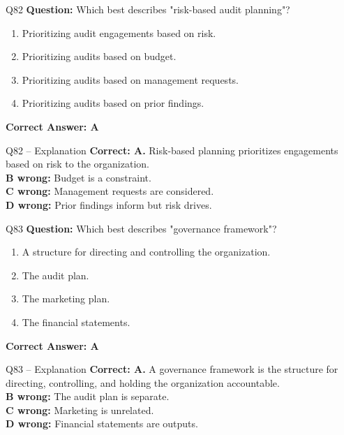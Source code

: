 \documentclass[aspectratio=169,10pt]{beamer}
\begin{document}
	\begin{frame}[t]{Q82}
		\small
		\textbf{Question:} Which best describes "risk-based audit planning"?
		\begin{enumerate}[label=\Alph*.,itemsep=1pt,topsep=2pt]
			\item Prioritizing audit engagements based on risk.
			\item Prioritizing audits based on budget.
			\item Prioritizing audits based on management requests.
			\item Prioritizing audits based on prior findings.
		\end{enumerate}
		\vspace{4pt}
		\textbf{Correct Answer: A}
	\end{frame}
	
	\begin{frame}[t]{Q82 -- Explanation}
		\small
		\textbf{Correct: A.} Risk-based planning prioritizes engagements based on risk to the organization. \\[4pt]
		\textbf{B wrong:} Budget is a constraint. \\[2pt]
		\textbf{C wrong:} Management requests are considered. \\[2pt]
		\textbf{D wrong:} Prior findings inform but risk drives.
	\end{frame}
	
	\begin{frame}[t]{Q83}
		\small
		\textbf{Question:} Which best describes "governance framework"?
		\begin{enumerate}[label=\Alph*.,itemsep=1pt,topsep=2pt]
			\item A structure for directing and controlling the organization.
			\item The audit plan.
			\item The marketing plan.
			\item The financial statements.
		\end{enumerate}
		\vspace{4pt}
		\textbf{Correct Answer: A}
	\end{frame}
	
	\begin{frame}[t]{Q83 -- Explanation}
		\small
		\textbf{Correct: A.} A governance framework is the structure for directing, controlling, and holding the organization accountable. \\[4pt]
		\textbf{B wrong:} The audit plan is separate. \\[2pt]
		\textbf{C wrong:} Marketing is unrelated. \\[2pt]
		\textbf{D wrong:} Financial statements are outputs.
	\end{frame}
	
\end{document}
